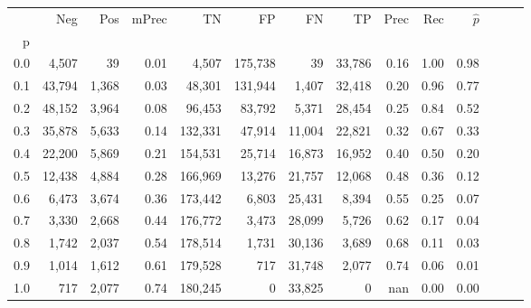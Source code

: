\begin{tabular}{rrrrrrrrrrrrrr}
\toprule
{} &     Neg &    Pos & mPrec &       TN &       FP &      FN &      TP &  Prec &   Rec & $\hat{p}$ \\
p   &         &        &       &          &          &         &         &       &       &           \\
\midrule
0.0 &   4,507 &     39 &  0.01 &    4,507 &  175,738 &      39 &  33,786 &  0.16 &  1.00 &      0.98 \\
0.1 &  43,794 &  1,368 &  0.03 &   48,301 &  131,944 &   1,407 &  32,418 &  0.20 &  0.96 &      0.77 \\
0.2 &  48,152 &  3,964 &  0.08 &   96,453 &   83,792 &   5,371 &  28,454 &  0.25 &  0.84 &      0.52 \\
0.3 &  35,878 &  5,633 &  0.14 &  132,331 &   47,914 &  11,004 &  22,821 &  0.32 &  0.67 &      0.33 \\
0.4 &  22,200 &  5,869 &  0.21 &  154,531 &   25,714 &  16,873 &  16,952 &  0.40 &  0.50 &      0.20 \\
0.5 &  12,438 &  4,884 &  0.28 &  166,969 &   13,276 &  21,757 &  12,068 &  0.48 &  0.36 &      0.12 \\
0.6 &   6,473 &  3,674 &  0.36 &  173,442 &    6,803 &  25,431 &   8,394 &  0.55 &  0.25 &      0.07 \\
0.7 &   3,330 &  2,668 &  0.44 &  176,772 &    3,473 &  28,099 &   5,726 &  0.62 &  0.17 &      0.04 \\
0.8 &   1,742 &  2,037 &  0.54 &  178,514 &    1,731 &  30,136 &   3,689 &  0.68 &  0.11 &      0.03 \\
0.9 &   1,014 &  1,612 &  0.61 &  179,528 &      717 &  31,748 &   2,077 &  0.74 &  0.06 &      0.01 \\
1.0 &     717 &  2,077 &  0.74 &  180,245 &        0 &  33,825 &       0 &   nan &  0.00 &      0.00 \\
\bottomrule
\end{tabular}
